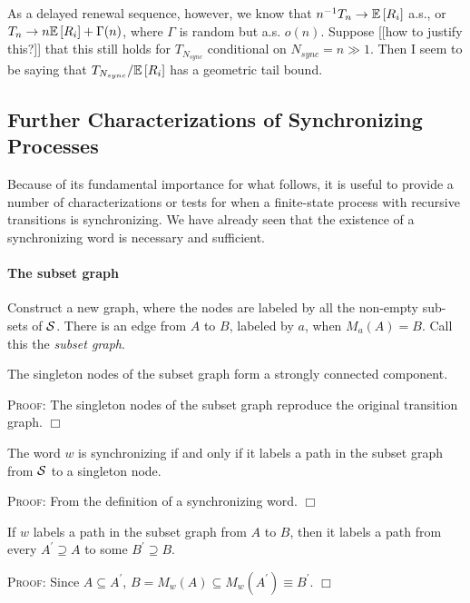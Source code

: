 \documentclass[../new-procedure.tex]{subfiles}
\begin{document}
As a delayed renewal sequence, however, we know that $n^{-1} T_n \rightarrow
\mathbb{E}\left[ R_i \right]$ a.s., or $T_n \rightarrow n\mathbb{E}\left[ R_i \right] + \Gamma(n)$, where
$\Gamma$ is random but a.s. $o(n)$.  Suppose [[how to justify this?]]  that
this still holds for $T_{N_{sync}}$ conditional on $N_{sync} = n \gg 1$.  Then
I seem to be saying that $T_{N_{sync}}/\mathbb{E}\left[ R_i \right]$ has a geometric tail
bound.



\subsection*{Further Characterizations of Synchronizing Processes}

Because of its fundamental importance for what follows, it is useful to provide
a number of characterizations or tests for when a finite-state process with
recursive transitions is synchronizing.  We have already seen that the
existence of a synchronizing word is necessary and sufficient.

\paragraph{The subset graph} Construct a new graph, where the nodes are labeled
by all the non-empty sub-sets of $\mathcal{S}$.  There is an edge from $A$ to
$B$, labeled by $a$, when $M_a(A) = B$.  Call this the {\em subset graph}.

\begin{proposition}
  The singleton nodes of the subset graph form a strongly connected component.
\end{proposition}

\textsc{Proof}: The singleton nodes of the subset graph reproduce the original
transition graph. $\Box$

\begin{proposition}
  The word $w$ is synchronizing if and only if it labels a path in the subset
  graph from $\mathcal{S}$ to a singleton node.
\end{proposition}

\textsc{Proof}: From the definition of a synchronizing word. $\Box$

\begin{proposition}
  If $w$ labels a path in the subset graph from $A$ to $B$, then it labels a
  path from every $A^\prime \supseteq A$ to some $B^\prime \supseteq B$.
\end{proposition}

\textsc{Proof}: Since $A \subseteq A^\prime$, $B = M_w(A) \subseteq
M_w(A^\prime) \equiv B^\prime$. $\Box$
\end{document}
